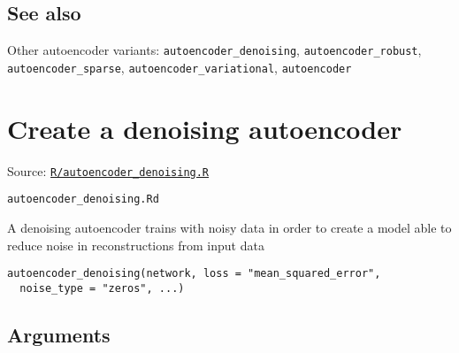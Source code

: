 \hypertarget{see-also}{\subsection{\texorpdfstring{\protect\hyperlink{see-also}{}See
also}{See also}}\label{see-also}}

Other autoencoder variants: \texttt{autoencoder\_denoising},
\texttt{autoencoder\_robust}, \texttt{autoencoder\_sparse},
\texttt{autoencoder\_variational}, \texttt{autoencoder}

\section{Create a denoising
autoencoder}\label{create-a-denoising-autoencoder}

Source:
\href{https://github.com/fdavidcl/ruta/blob/master/R/autoencoder_denoising.R}{\texttt{R/autoencoder\_denoising.R}}

\texttt{autoencoder\_denoising.Rd}

A denoising autoencoder trains with noisy data in order to create a
model able to reduce noise in reconstructions from input data

\begin{verbatim}
autoencoder_denoising(network, loss = "mean_squared_error",
  noise_type = "zeros", ...)
\end{verbatim}

\hypertarget{arguments}{\subsection{\texorpdfstring{\protect\hyperlink{arguments}{}Arguments}{Arguments}}\label{arguments}}


